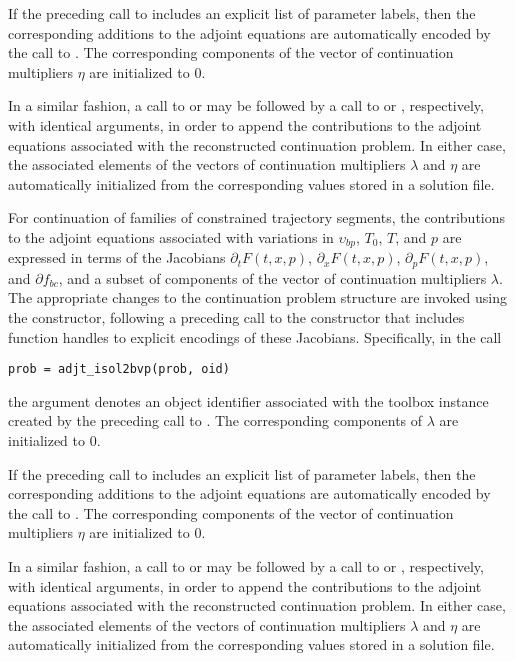 If the preceding call to  includes an explicit list of parameter labels, then the corresponding additions to the adjoint equations are automatically encoded by the call to . The corresponding components of the vector of continuation multipliers $\eta$ are initialized to $0$.

In a similar fashion, a call to  or  may be followed by a call to  or , respectively, with identical arguments, in order to append the contributions to the adjoint equations associated with the reconstructed continuation problem. In either case, the associated elements of the vectors of continuation multipliers $\lambda$ and $\eta$ are automatically initialized from the corresponding values stored in a solution file.

For continuation of families of constrained trajectory segments, the contributions to the adjoint equations associated with variations in $\upsilon_{bp}$, $T_0$, $T$, and $p$ are expressed in terms of the Jacobians $\partial_t F(t,x,p)$, $\partial_x F(t,x,p)$, $\partial_p F(t,x,p)$, and $\partial f_{bc}$, and a subset of components of the vector of continuation multipliers $\lambda$. The appropriate changes to the continuation problem structure are invoked using the  constructor, following a preceding call to the  constructor that includes function handles to explicit encodings of these Jacobians.  Specifically, in the call
\begin{lstlisting}[language=coco-highlight]
prob = adjt_isol2bvp(prob, oid)
\end{lstlisting}
the  argument denotes an object identifier associated with the toolbox instance created by the preceding call to . The corresponding components of $\lambda$ are initialized to $0$.

If the preceding call to  includes an explicit list of parameter labels, then the corresponding additions to the adjoint equations are automatically encoded by the call to . The corresponding components of the vector of continuation multipliers $\eta$ are initialized to $0$.

In a similar fashion, a call to  or  may be followed by a call to  or , respectively, with identical arguments, in order to append the contributions to the adjoint equations associated with the reconstructed continuation problem. In either case, the associated elements of the vectors of continuation multipliers $\lambda$ and $\eta$ are automatically initialized from the corresponding values stored in a solution file.

